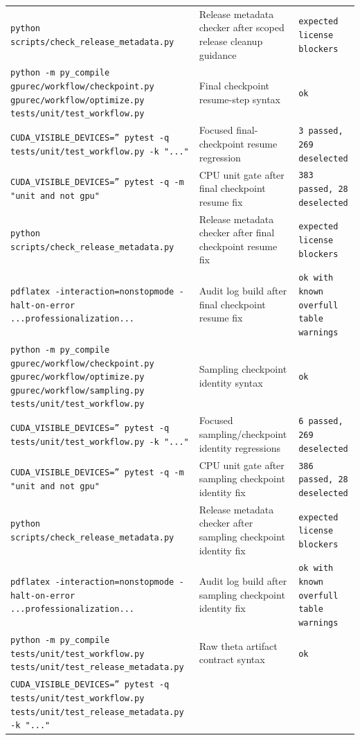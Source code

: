 \documentclass[11pt]{article}
\begin{document}
\begin{center}
\begin{tabular}{lll}
\texttt{python scripts/check\_release\_metadata.py} &
Release metadata checker after scoped release cleanup guidance &
\texttt{expected license blockers} \\
\texttt{python -m py\_compile gpurec/workflow/checkpoint.py gpurec/workflow/optimize.py tests/unit/test\_workflow.py} &
Final checkpoint resume-step syntax &
\texttt{ok} \\
\texttt{CUDA\_VISIBLE\_DEVICES='' pytest -q tests/unit/test\_workflow.py -k "..."} &
Focused final-checkpoint resume regression &
\texttt{3 passed, 269 deselected} \\
\texttt{CUDA\_VISIBLE\_DEVICES='' pytest -q -m "unit and not gpu"} &
CPU unit gate after final checkpoint resume fix &
\texttt{383 passed, 28 deselected} \\
\texttt{python scripts/check\_release\_metadata.py} &
Release metadata checker after final checkpoint resume fix &
\texttt{expected license blockers} \\
\texttt{pdflatex -interaction=nonstopmode -halt-on-error ...professionalization...} &
Audit log build after final checkpoint resume fix &
\texttt{ok with known overfull table warnings} \\
\texttt{python -m py\_compile gpurec/workflow/checkpoint.py gpurec/workflow/optimize.py gpurec/workflow/sampling.py tests/unit/test\_workflow.py} &
Sampling checkpoint identity syntax &
\texttt{ok} \\
\texttt{CUDA\_VISIBLE\_DEVICES='' pytest -q tests/unit/test\_workflow.py -k "..."} &
Focused sampling/checkpoint identity regressions &
\texttt{6 passed, 269 deselected} \\
\texttt{CUDA\_VISIBLE\_DEVICES='' pytest -q -m "unit and not gpu"} &
CPU unit gate after sampling checkpoint identity fix &
\texttt{386 passed, 28 deselected} \\
\texttt{python scripts/check\_release\_metadata.py} &
Release metadata checker after sampling checkpoint identity fix &
\texttt{expected license blockers} \\
\texttt{pdflatex -interaction=nonstopmode -halt-on-error ...professionalization...} &
Audit log build after sampling checkpoint identity fix &
\texttt{ok with known overfull table warnings} \\
\texttt{python -m py\_compile tests/unit/test\_workflow.py tests/unit/test\_release\_metadata.py} &
Raw theta artifact contract syntax &
\texttt{ok} \\
\texttt{CUDA\_VISIBLE\_DEVICES='' pytest -q tests/unit/test\_workflow.py tests/unit/test\_release\_metadata.py -k "..."} &

\end{tabular}
\end{center}
\end{document}
